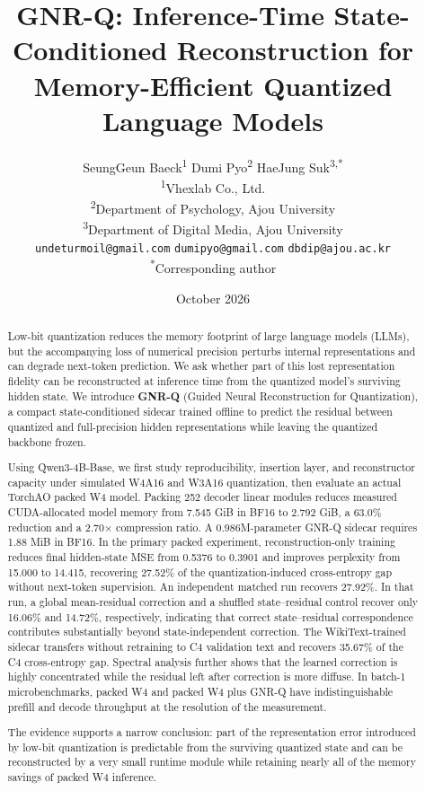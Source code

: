 \documentclass[11pt]{article}
\title{\textbf{GNR-Q: Inference-Time State-Conditioned Reconstruction for Memory-Efficient Quantized Language Models}}
\author{%
SeungGeun Baeck\textsuperscript{1} \quad
Dumi Pyo\textsuperscript{2} \quad
HaeJung Suk\textsuperscript{3,*}\\[0.5em]
\small \textsuperscript{1}Vhexlab Co., Ltd. \\
\small \textsuperscript{2}Department of Psychology, Ajou University \\
\small \textsuperscript{3}Department of Digital Media, Ajou University \\[0.25em]
\small \texttt{undeturmoil@gmail.com} \quad
\texttt{dumipyo@gmail.com} \quad
\texttt{dbdip@ajou.ac.kr} \\
\small \textsuperscript{*}Corresponding author
}
\date{October 2026}
\begin{document}
\maketitle

\begin{abstract}
Low-bit quantization reduces the memory footprint of large language models (LLMs), but the accompanying loss of numerical precision perturbs internal representations and can degrade next-token prediction. We ask whether part of this lost representation fidelity can be reconstructed at inference time from the quantized model's surviving hidden state. We introduce \textbf{GNR-Q} (Guided Neural Reconstruction for Quantization), a compact state-conditioned sidecar trained offline to predict the residual between quantized and full-precision hidden representations while leaving the quantized backbone frozen.

Using Qwen3-4B-Base, we first study reproducibility, insertion layer, and reconstructor capacity under simulated W4A16 and W3A16 quantization, then evaluate an actual TorchAO packed W4 model. Packing 252 decoder linear modules reduces measured CUDA-allocated model memory from 7.545 GiB in BF16 to 2.792 GiB, a 63.0\% reduction and a 2.70$\times$ compression ratio. A 0.986M-parameter GNR-Q sidecar requires 1.88 MiB in BF16. In the primary packed experiment, reconstruction-only training reduces final hidden-state MSE from 0.5376 to 0.3901 and improves perplexity from 15.000 to 14.415, recovering 27.52\% of the quantization-induced cross-entropy gap without next-token supervision. An independent matched run recovers 27.92\%. In that run, a global mean-residual correction and a shuffled state--residual control recover only 16.06\% and 14.72\%, respectively, indicating that correct state--residual correspondence contributes substantially beyond state-independent correction. The WikiText-trained sidecar transfers without retraining to C4 validation text and recovers 35.67\% of the C4 cross-entropy gap. Spectral analysis further shows that the learned correction is highly concentrated while the residual left after correction is more diffuse. In batch-1 microbenchmarks, packed W4 and packed W4 plus GNR-Q have indistinguishable prefill and decode throughput at the resolution of the measurement.

The evidence supports a narrow conclusion: part of the representation error introduced by low-bit quantization is predictable from the surviving quantized state and can be reconstructed by a very small runtime module while retaining nearly all of the memory savings of packed W4 inference.
\end{abstract}
\end{document}
